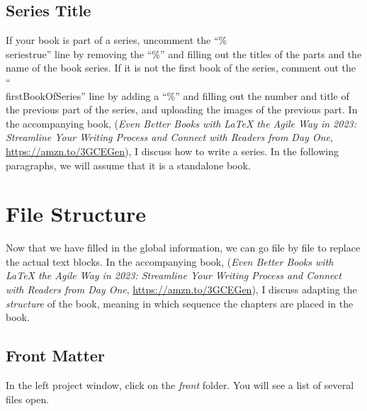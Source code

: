 \subsection{Series Title}

If your book is part of a series, uncomment the ``\%\\seriestrue'' line by removing the ``\%'' and filling out the titles of the parts and the name of the book series. If it is not the first book of the series, comment out the ``\\firstBookOfSeries'' line by adding a ``\%'' and filling out the number and title of the previous part of the series, and uploading the images of the previous part. In the accompanying book, (\textit{Even Better Books with LaTeX the Agile Way in 2023: Streamline Your Writing Process and Connect with Readers from Day One}, \url{https://amzn.to/3GCEGen}), I discuss how to write a series. In the following paragraphs, we will assume that it is a standalone book.



\section{File Structure}\label{filestructure:sec}

Now that we have filled in the global information, we can go file by file to replace the actual text blocks. In the accompanying book, (\textit{Even Better Books with LaTeX the Agile Way in 2023: Streamline Your Writing Process and Connect with Readers from Day One}, \url{https://amzn.to/3GCEGen}), I discuss adapting the \textit{structure} of the book, meaning in which sequence the chapters are placed in the book.

\subsection{Front Matter}\label{frontmatter:sec}

In the left project window, click on the \textit{front} folder. You will see a list of several files open.

